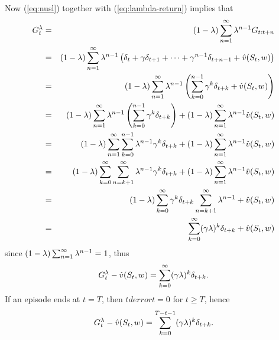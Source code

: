 Now (\ref{eq:nusl}) together with (\ref{eq:lambda-return}) implies that
\begin{eqnarray*}
G^{\lambda}_{t} &=& (1-\lambda) \sum_{n=1}^\infty \lambda^{n-1} G_{{t}:{t+n}}
\\
&=& (1-\lambda) \sum_{n=1}^\infty \lambda^{n-1}
\left( \delta_{t} + \gamma \delta_{t+1} +  \cdots + \gamma^{n-1} \delta_{t+n-1} + \hat{v}(S_{t}, {w_{}}) \right)
\\
&=& (1-\lambda) \sum_{n=1}^\infty \lambda^{n-1}
\left(\sum_{k=0}^{n-1} \gamma^k \delta_{t+k} + \hat{v}(S_{t}, {w_{}}) \right)
\\
&=& (1-\lambda) \sum_{n=1}^\infty \lambda^{n-1}
\left(\sum_{k=0}^{n-1} \gamma^k \delta_{t+k} \right)
+ (1-\lambda) \sum_{n=1}^\infty \lambda^{n-1} \hat{v}(S_{t}, {w_{}})
\\
&=& (1-\lambda) \sum_{n=1}^{\infty} \sum_{k=0}^{n-1} \lambda^{n-1} \gamma^k \delta_{t+k}
+ (1-\lambda) \sum_{n=1}^\infty \lambda^{n-1} \hat{v}(S_{t}, {w_{}})
\\
&=& (1-\lambda) \sum_{k=0}^{\infty} \sum_{n=k+1}^\infty \lambda^{n-1} \gamma^k \delta_{t+k}
+ (1-\lambda) \sum_{n=1}^\infty \lambda^{n-1} \hat{v}(S_{t}, {w_{}})
\\
&=& (1-\lambda) \sum_{k=0}^{\infty} \gamma^k \delta_{t+k} \sum_{n=k+1}^\infty \lambda^{n-1}
+ \hat{v}(S_{t}, {w_{}})
\\
&=& \sum_{k=0}^{\infty} (\gamma \lambda)^k \delta_{t+k} + \hat{v}(S_{t}, {w_{}})
\end{eqnarray*}
since $(1-\lambda) \sum_{n=1}^\infty \lambda^{n-1} = 1$,
thus
\begin{equation}
G^{\lambda}_{t} - \hat{v}(S_{t}, {w_{}}) = \sum_{k=0}^{\infty} (\gamma \lambda)^k \delta_{t+k}.
\end{equation}
If an episode ends at $t=T$, then $tderror{t}=0$ for $t\geq T$,
hence
\begin{equation}
\label{eq:bysig}
G^{\lambda}_{t} - \hat{v}(S_{t}, {w_{}}) = \sum_{k=0}^{T-t-1} (\gamma \lambda)^k \delta_{t+k}.
\end{equation}

